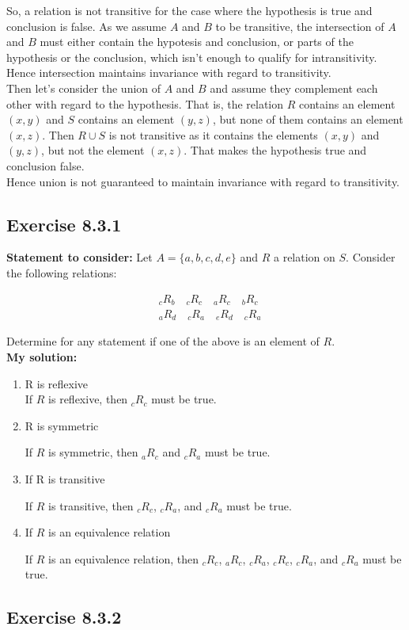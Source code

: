 \documentclass{report}
\newcommand{\mAlign}[1]{\begin{align*}#1\end{align*}}
\newcommand{\assignmentDescription}{\textbf{Statement to consider: }}
\newcommand{\solution}{\textbf{My solution: }}
\newcommand{\Exercise}[1]{\subsection{Exercise #1}}
\newcommand{\defaultEnumerateLabel}{\textbf{\alph*.}}
\begin{document}
	So, a relation is not transitive for the case where the hypothesis is true and conclusion is false. As we assume $A$ and $B$ to be transitive, the intersection of $A$ and $B$ must either contain the hypotesis and conclusion, or parts of the hypothesis or the conclusion, which isn't enough to qualify for intransitivity.\\
	
	Hence intersection maintains invariance with regard to transitivity.\\
	
	Then let's consider the union of $A$ and $B$ and assume they complement each other with regard to the hypothesis. That is, the relation $R$ contains an element $(x,y)$ and $S$ contains an element $(y,z)$, but none of them contains an element $(x,z)$. Then $R \cup S$ is not transitive as it contains the elements $(x,y)$ and $(y,z)$, but not the element $(x,z)$. That makes the hypothesis true and conclusion false.\\
	
	Hence union is not guaranteed to maintain invariance with regard to transitivity.
	
	\Exercise{8.3.1}
	
	\assignmentDescription
	Let $A=\{a,b,c,d,e\}$ and $R$ a relation on $S$. Consider the following relations:
	
	\mAlign{&_cR_b \quad  _cR_c \quad _aR_c \quad  _bR_c \\
					&_aR_d \quad  _cR_a \quad _e R_d  \quad _cR_a } 
	
	Determine for any statement if one of the above is an element of $R$.\\
	
	\solution
	
	\begin{enumerate}[label=\defaultEnumerateLabel]
		\item R is reflexive\\
		
		If $R$ is reflexive, then $_cR_c$ must be true.
		
		\item R is symmetric
		
		If $R$ is symmetric, then $_aR_c$ and $_cR_a$ must be true.
		
		\item If R is transitive
		
		If $R$ is transitive, then $_cR_c$, $_cR_a$, and $_cR_a$ must be true.
		
		\item If $R$ is an equivalence relation
		
		If $R$ is an equivalence relation, then $_cR_c$, $_aR_c$, $_cR_a$, $_cR_c$, $_cR_a$, and $_cR_a$ must be true.
	\end{enumerate}
	\Exercise{8.3.2}
	
\end{document}

